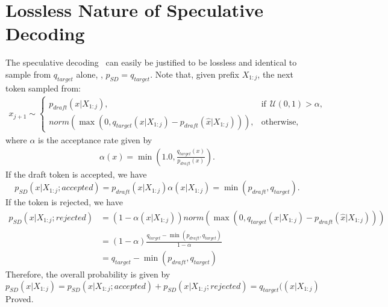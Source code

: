\newpage
\appendix
\onecolumn


\clearpage

\section{Lossless Nature of Speculative Decoding}
\label{app:lossless}

The speculative decoding~\citep{sd1,sd2} can easily be justified to be lossless and identical to sample from $q_{target}$ alone, \ie,  $p_{SD} = q_{target}$.
Note that, given prefix $X_{1:j}$, the next token sampled from:
\begin{equation}
\nonumber
\begin{aligned}
    x_{j+1} \sim \begin{cases}
    p_{draft}(x|X_{1:j}), & \text{if}~~ \mathcal{U}(0, 1) > \alpha, \\
     norm(\max (0, q_{target}(x|X_{1:j}) - p_{draft}(\hat{x}|X_{1:j}))), & \text{otherwise},
    \end{cases}
\end{aligned}
\end{equation}
where $\alpha$ is the acceptance rate given by
\begin{equation}
\nonumber
\begin{aligned}
    \alpha(x) = \min\left(1.0, \frac{q_{target}(x)}{p_{draft}(x)} \right).
\end{aligned}
\end{equation}
If the draft token is accepted, we have
\[
p_{SD}(x|X_{1:j};accepted) = p_{draft}(x|X_{1:j}) \alpha(x|X_{1:j}) = \min(p_{draft}, q_{target}). 
\]
If the token is rejected, we have 
\begin{equation*}
\begin{aligned}
    p_{SD}(x|X_{1:j};rejected) &=  (1 - \alpha(x|X_{1:j})) norm(\max (0, q_{target}(x|X_{1:j}) - p_{draft}(\hat{x}|X_{1:j}))) \\
&= (1 - \alpha) \frac{q_{target} - \min(p_{draft}, q_{target})}{ 1 - \alpha} \\
& = q_{target} - \min(p_{draft}, q_{target})
\end{aligned}
\end{equation*}
Therefore, the overall probability is given by
\[
p_{SD}(x|X_{1:j}) = p_{SD}(x|X_{1:j};accepted) + p_{SD}(x|X_{1:j};rejected) = q_{target}((x|X_{1:j})
\]
Proved.


